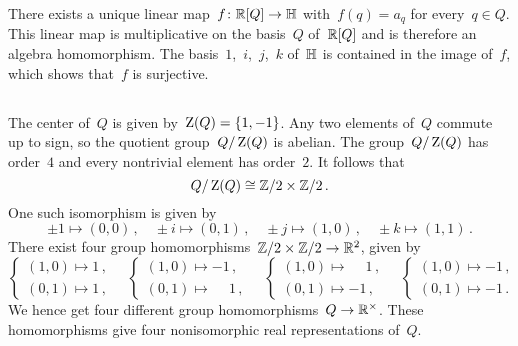 There exists a unique linear map~$f \colon \mathbb{R}[Q] \to \mathbb{H}$ with~$f(q) = a_q$ for every~$q \in Q$.
This linear map is multiplicative on the basis~$Q$ of~$\mathbb{R}[Q]$ and is therefore an algebra homomorphism.
The basis~$1$,~$i$,~$j$,~$k$ of~$\mathbb{H}$ is contained in the image of~$f$, which shows that~$f$ is surjective.





\subsection{}

The center of~$Q$ is given by~$\operatorname{Z}(Q) = \{1, -1\}$.
Any two elements of~$Q$ commute up to sign, so the quotient group~$Q/\operatorname{Z}(Q)$ is abelian.
The group~$Q/\operatorname{Z}(Q)$ has order~$4$ and every nontrivial element has order~$2$.
It follows that
\[
  Q/\operatorname{Z}(Q)
  \cong
  \mathbb{Z}/2 \times \mathbb{Z}/2  \,.
\]
One such isomorphism is given by
\[
  \pm 1 \mapsto (0,0) \,, \quad
  \pm i \mapsto (0,1) \,, \quad
  \pm j \mapsto (1,0) \,, \quad
  \pm k \mapsto (1,1) \,.
\]
There exist four group homomorphisms~$\mathbb{Z}/2 \times \mathbb{Z}/2 \to \mathbb{R}^2$, given by
\[
  \begin{cases}
    (1,0) \mapsto 1 \,, \\
    (0,1) \mapsto 1 \,,
  \end{cases}
  \quad
  \begin{cases}
    (1,0) \mapsto           -1  \,, \\
    (0,1) \mapsto \phantom{-}1  \,,
  \end{cases}
  \quad
  \begin{cases}
    (1,0) \mapsto \phantom{-}1  \,, \\
    (0,1) \mapsto           -1  \,,
  \end{cases}
  \quad
  \begin{cases}
    (1,0) \mapsto -1  \,, \\
    (0,1) \mapsto -1  \,.
  \end{cases}
  \quad
\]
We hence get four different group homomorphisms~$Q \to \mathbb{R}^\times$.
These homomorphisms give four nonisomorphic  real representations of~$Q$.





\subsection{}


